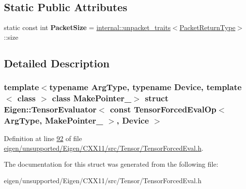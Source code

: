 \subsection*{Static Public Attributes}
\begin{DoxyCompactItemize}
\item 
\mbox{\label{struct_eigen_1_1_tensor_evaluator_3_01const_01_tensor_forced_eval_op_3_01_arg_type_00_01_make_pointer___01_4_00_01_device_01_4_a7f21f2262184db37be49a3216a46fdf9}} 
static const int {\bfseries Packet\+Size} = \hyperlink{struct_eigen_1_1internal_1_1unpacket__traits}{internal\+::unpacket\+\_\+traits}$<$\hyperlink{group___sparse_core___module}{Packet\+Return\+Type}$>$\+::size
\end{DoxyCompactItemize}


\subsection{Detailed Description}
\subsubsection*{template$<$typename Arg\+Type, typename Device, template$<$ class $>$ class Make\+Pointer\+\_\+$>$\newline
struct Eigen\+::\+Tensor\+Evaluator$<$ const Tensor\+Forced\+Eval\+Op$<$ Arg\+Type, Make\+Pointer\+\_\+ $>$, Device $>$}



Definition at line \hyperlink{eigen_2unsupported_2_eigen_2_c_x_x11_2src_2_tensor_2_tensor_forced_eval_8h_source_l00092}{92} of file \hyperlink{eigen_2unsupported_2_eigen_2_c_x_x11_2src_2_tensor_2_tensor_forced_eval_8h_source}{eigen/unsupported/\+Eigen/\+C\+X\+X11/src/\+Tensor/\+Tensor\+Forced\+Eval.\+h}.



The documentation for this struct was generated from the following file\+:\begin{DoxyCompactItemize}
\item 
eigen/unsupported/\+Eigen/\+C\+X\+X11/src/\+Tensor/\+Tensor\+Forced\+Eval.\+h\end{DoxyCompactItemize}
